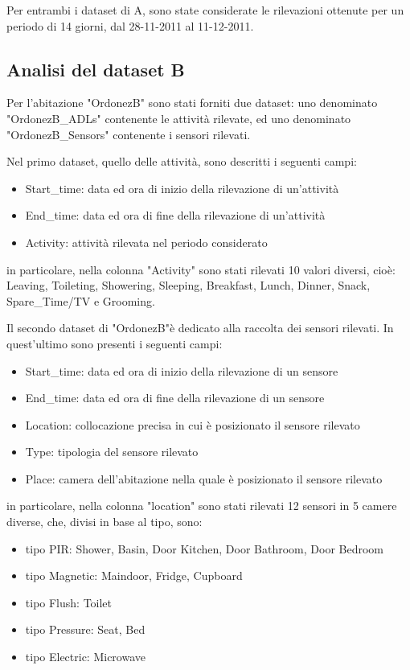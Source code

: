 \documentclass[10pt,a4paper]{article}
\begin{document}
	Per entrambi i dataset di A, sono state considerate le rilevazioni ottenute per un periodo di 14 giorni, dal 28-11-2011 al 11-12-2011.
	
	\subsection{Analisi del dataset B}
	
	Per l'abitazione "OrdonezB" sono stati forniti due dataset: uno denominato "OrdonezB\_ADLs" contenente le attività rilevate, ed uno denominato  "OrdonezB\_Sensors"	 contenente i sensori rilevati.
	
	Nel primo dataset, quello delle attività, sono descritti i seguenti campi:
	
	\begin{itemize}
		\item Start\_time: data ed ora di inizio della rilevazione di un'attività
		\item End\_time: data ed ora di fine della rilevazione di un'attività
		\item  Activity: attività rilevata nel periodo considerato
	\end{itemize}
	
	in particolare, nella colonna "Activity" sono stati rilevati 10 valori diversi, cioè: Leaving, Toileting, Showering, Sleeping, Breakfast, Lunch, Dinner, Snack, Spare\_Time/TV e Grooming. 
	
	Il secondo dataset di "OrdonezB"è dedicato alla raccolta dei sensori rilevati. In quest'ultimo sono presenti i seguenti campi:
	\begin{itemize}
		\item Start\_time: data ed ora di inizio della rilevazione di un sensore
		\item End\_time: data ed ora di fine della rilevazione di un sensore
		\item  Location: collocazione precisa in cui è posizionato il sensore rilevato
		\item Type: tipologia del sensore rilevato
		\item Place: camera dell'abitazione nella quale è posizionato il sensore rilevato
	\end{itemize}
	
	in particolare, nella colonna "location" sono stati rilevati 12 sensori in 5 camere diverse, che, divisi in base al tipo, sono:
	
	\begin{itemize}
		\item tipo PIR: Shower, Basin, Door Kitchen, Door Bathroom, Door Bedroom
		\item tipo Magnetic: Maindoor, Fridge, Cupboard
		\item  tipo Flush: Toilet
		\item tipo Pressure: Seat, Bed
		\item tipo Electric: Microwave
	\end{itemize}
	
\end{document}
